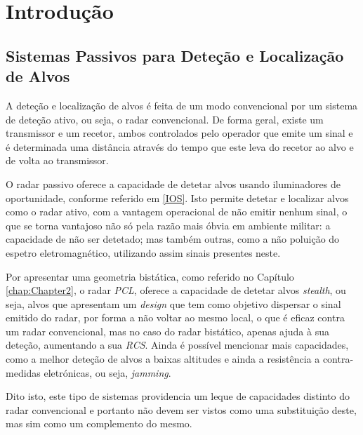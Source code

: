 % 
\chapter{Introdução} %
\label{chap:Chapter1} %


%




\section{Sistemas Passivos para Deteção e Localização de Alvos}
A deteção e localização de alvos é feita de um modo convencional por um sistema de deteção ativo, ou seja, o radar convencional. De forma geral, existe um transmissor e um recetor, ambos controlados pelo operador que emite um sinal e é determinada uma distância através do tempo que este leva do recetor ao alvo e de volta ao transmissor.\par 
O radar passivo oferece a capacidade de detetar alvos usando iluminadores de oportunidade, conforme referido em \ref{IOS}. Isto permite detetar e localizar alvos como o radar ativo, com a vantagem operacional de não emitir nenhum sinal, o que se torna vantajoso não só pela razão mais óbvia em ambiente militar: a capacidade de não ser detetado; mas também outras, como a não poluição do espetro eletromagnético, utilizando assim sinais presentes neste.\par 
Por apresentar uma geometria bistática, como referido no Capítulo \ref{chap:Chapter2}, o radar \textit{\gls{PCL}}, oferece a capacidade de detetar alvos \textit{stealth}, ou seja, alvos que apresentam um \textit{design} que tem como objetivo dispersar o sinal emitido do radar, por forma a não voltar ao mesmo local, o que é eficaz contra um radar convencional, mas no caso do radar bistático, apenas ajuda à sua deteção, aumentando a sua \textit{\gls{RCS}}. Ainda é possível mencionar mais capacidades, como a melhor deteção de alvos a baixas altitudes e ainda a resistência a contra-medidas eletrónicas, ou seja, \textit{jamming}.\par
Dito isto, este tipo de sistemas providencia um leque de capacidades distinto do radar convencional e portanto não devem ser vistos como uma substituição deste, mas sim como um complemento do mesmo. 

